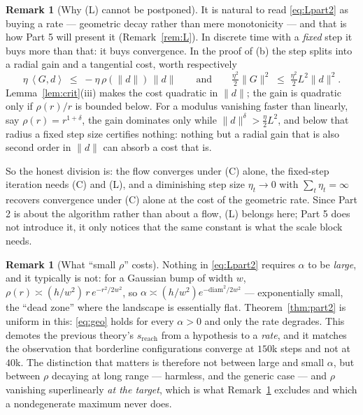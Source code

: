 \documentclass[11pt]{article}
\theoremstyle{definition}
\newtheorem{remark}[theorem]{Remark}
\newcommand{\ip}[2]{\left\langle #1, #2 \right\rangle}
\begin{document}
\begin{remark}[Why (L) cannot be postponed]\label{rem:needL}
It is natural to read \eqref{eq:Lpart2} as buying a rate --- geometric decay
rather than mere monotonicity --- and that is how Part 5 will present it
(Remark~\ref{rem:L}). In discrete time with a \emph{fixed} step it buys more than
that: it buys convergence. In the proof of (b) the step splits into a radial gain
and a tangential cost, worth respectively
\[
  \eta\,\ip{G}{d} \;\le\; -\eta\,\rho(\|d\|)\,\|d\|
  \qquad\text{and}\qquad
  \tfrac{\eta^2}{2}\|G\|^2 \;\le\; \tfrac{\eta^2}{2}L^2\|d\|^2 .
\]
Lemma~\ref{lem:crit}(iii) makes the cost quadratic in $\|d\|$; the gain is
quadratic only if $\rho(r)/r$ is bounded below. For a modulus vanishing faster
than linearly, say $\rho(r) = r^{1+\delta}$, the gain dominates only while
$\|d\|^{\delta} > \tfrac{\eta}{2}L^2$, and below that radius a fixed step size
certifies nothing: nothing but a radial gain that is also second order in $\|d\|$
can absorb a cost that is.

So the honest division is: the flow converges under (C) alone, the fixed-step
iteration needs (C) and (L), and a diminishing step size $\eta_t \to 0$ with
$\sum_t \eta_t = \infty$ recovers convergence under (C) alone at the cost of the
geometric rate. Since Part 2 is about the algorithm rather than about a flow, (L)
belongs here; Part 5 does not introduce it, it only notices that the same constant
is what the scale block needs.
\end{remark}

\begin{remark}[What ``small $\rho$'' costs]\label{rem:rho}
Nothing in \eqref{eq:Lpart2} requires $\alpha$ to be \emph{large}, and it
typically is not: for a Gaussian bump of width $w$, $\rho(r) \asymp (h/w^2)\,r\,
e^{-r^2/2w^2}$, so $\alpha \asymp (h/w^2)e^{-\mathrm{diam}^2/2w^2}$ ---
exponentially small, the ``dead zone'' where the landscape is essentially flat.
Theorem~\ref{thm:part2} is uniform in this: \eqref{eq:geo} holds for every
$\alpha > 0$ and only the rate degrades. This demotes the previous theory's
$s_{\mathrm{reach}}$ from a hypothesis to a \emph{rate}, and it matches the
observation that borderline configurations converge at $150$k steps and not at
$40$k. The distinction that matters is therefore not between large and small
$\alpha$, but between $\rho$ decaying at long range --- harmless, and the generic
case --- and $\rho$ vanishing superlinearly \emph{at the target}, which is what
Remark~\ref{rem:needL} excludes and which a nondegenerate maximum never does.
\end{remark}
\end{document}
